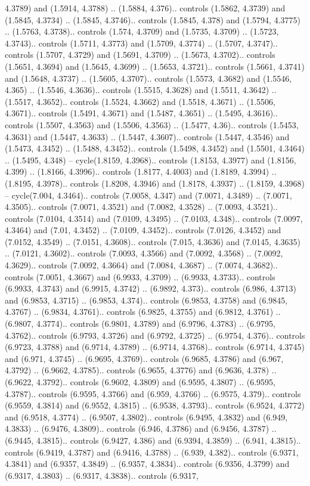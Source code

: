 4.3789) and (1.5914, 4.3788) .. (1.5884, 4.376).. controls (1.5862, 4.3739) and (1.5845, 4.3734) .. (1.5845, 4.3746).. controls (1.5845, 4.378) and (1.5794, 4.3775) .. (1.5763, 4.3738).. controls (1.574, 4.3709) and (1.5735, 4.3709) .. (1.5723, 4.3743).. controls (1.5711, 4.3773) and (1.5709, 4.3774) .. (1.5707, 4.3747).. controls (1.5707, 4.3729) and (1.5691, 4.3709) .. (1.5673, 4.3702).. controls (1.5651, 4.3694) and (1.5645, 4.3699) .. (1.5653, 4.3721).. controls (1.5661, 4.3741) and (1.5648, 4.3737) .. (1.5605, 4.3707).. controls (1.5573, 4.3682) and (1.5546, 4.365) .. (1.5546, 4.3636).. controls (1.5515, 4.3628) and (1.5511, 4.3642) .. (1.5517, 4.3652).. controls (1.5524, 4.3662) and (1.5518, 4.3671) .. (1.5506, 4.3671).. controls (1.5491, 4.3671) and (1.5487, 4.3651) .. (1.5495, 4.3616).. controls (1.5507, 4.3563) and (1.5506, 4.3563) .. (1.5477, 4.36).. controls (1.5453, 4.3631) and (1.5447, 4.3633) .. (1.5447, 4.3607).. controls (1.5447, 4.3546) and (1.5473, 4.3452) .. (1.5488, 4.3452).. controls (1.5498, 4.3452) and (1.5501, 4.3464) .. (1.5495, 4.348) -- cycle(1.8159, 4.3968).. controls (1.8153, 4.3977) and (1.8156, 4.399) .. (1.8166, 4.3996).. controls (1.8177, 4.4003) and (1.8189, 4.3994) .. (1.8195, 4.3978).. controls (1.8208, 4.3946) and (1.8178, 4.3937) .. (1.8159, 4.3968) -- cycle(7.004, 4.3464).. controls (7.0058, 4.347) and (7.0071, 4.3489) .. (7.0071, 4.3505).. controls (7.0071, 4.3521) and (7.0082, 4.3528) .. (7.0093, 4.3521).. controls (7.0104, 4.3514) and (7.0109, 4.3495) .. (7.0103, 4.348).. controls (7.0097, 4.3464) and (7.01, 4.3452) .. (7.0109, 4.3452).. controls (7.0126, 4.3452) and (7.0152, 4.3549) .. (7.0151, 4.3608).. controls (7.015, 4.3636) and (7.0145, 4.3635) .. (7.0121, 4.3602).. controls (7.0093, 4.3566) and (7.0092, 4.3568) .. (7.0092, 4.3629).. controls (7.0092, 4.3664) and (7.0084, 4.3687) .. (7.0074, 4.3682).. controls (7.0051, 4.3667) and (6.9933, 4.3709) .. (6.9933, 4.3733).. controls (6.9933, 4.3743) and (6.9915, 4.3742) .. (6.9892, 4.373).. controls (6.986, 4.3713) and (6.9853, 4.3715) .. (6.9853, 4.374).. controls (6.9853, 4.3758) and (6.9845, 4.3767) .. (6.9834, 4.3761).. controls (6.9825, 4.3755) and (6.9812, 4.3761) .. (6.9807, 4.3774).. controls (6.9801, 4.3789) and (6.9796, 4.3783) .. (6.9795, 4.3762).. controls (6.9793, 4.3726) and (6.9792, 4.3725) .. (6.9754, 4.376).. controls (6.9723, 4.3788) and (6.9714, 4.3789) .. (6.9714, 4.3768).. controls (6.9714, 4.3745) and (6.971, 4.3745) .. (6.9695, 4.3769).. controls (6.9685, 4.3786) and (6.967, 4.3792) .. (6.9662, 4.3785).. controls (6.9655, 4.3776) and (6.9636, 4.378) .. (6.9622, 4.3792).. controls (6.9602, 4.3809) and (6.9595, 4.3807) .. (6.9595, 4.3787).. controls (6.9595, 4.3766) and (6.959, 4.3766) .. (6.9575, 4.379).. controls (6.9559, 4.3814) and (6.9552, 4.3815) .. (6.9538, 4.3793).. controls (6.9524, 4.3772) and (6.9518, 4.3774) .. (6.9507, 4.3802).. controls (6.9495, 4.3832) and (6.949, 4.3833) .. (6.9476, 4.3809).. controls (6.946, 4.3786) and (6.9456, 4.3787) .. (6.9445, 4.3815).. controls (6.9427, 4.386) and (6.9394, 4.3859) .. (6.941, 4.3815).. controls (6.9419, 4.3787) and (6.9416, 4.3788) .. (6.939, 4.382).. controls (6.9371, 4.3841) and (6.9357, 4.3849) .. (6.9357, 4.3834).. controls (6.9356, 4.3799) and (6.9317, 4.3803) .. (6.9317, 4.3838).. controls (6.9317, 